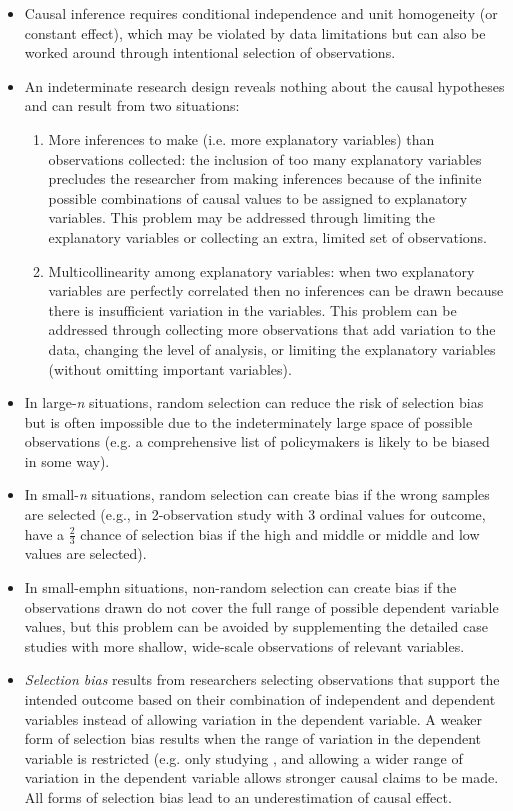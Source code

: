 \documentclass[11pt,letterpaper]{article}
\begin{document}
\begin{itemize}
\item Causal inference requires conditional independence and unit homogeneity (or constant effect), which may be violated by data limitations but can also be worked around through intentional selection of observations. 
\item An indeterminate research design reveals nothing about the causal hypotheses and can result from two situations: 
\begin{enumerate}
\item More inferences to make (i.e. more explanatory variables) than observations collected: the inclusion of too many explanatory variables precludes the researcher from making inferences because of the infinite possible combinations of causal values to be assigned to explanatory variables. This problem may be addressed through limiting the explanatory variables or collecting an extra, limited set of observations.
\item Multicollinearity among explanatory variables: when two explanatory variables are perfectly correlated then no inferences can be drawn because there is insufficient variation in the variables. This problem can be addressed through collecting more observations that add variation to the data, changing the level of analysis, or limiting the explanatory variables (without omitting important variables).
\end{enumerate}
\item In large-\emph{n} situations, random selection can reduce the risk of selection bias but is often impossible due to the indeterminately large space of possible observations (e.g. a comprehensive list of policymakers is likely to be biased in some way).
\item In small-\emph{n} situations, random selection can create bias if the wrong samples are selected (e.g., in 2-observation study with 3 ordinal values for outcome, have a $\frac{2}{3}$ chance of selection bias if the high and middle or middle and low values are selected). 
\item In small-emph{n} situations, non-random selection can create bias if the observations drawn do not cover the full range of possible dependent variable values, but this problem can be avoided by supplementing the detailed case studies with more shallow, wide-scale observations of relevant variables.
\item \emph{Selection bias} results from researchers selecting observations that support the intended outcome based on their combination of independent and dependent variables instead of allowing variation in the dependent variable. A weaker form of selection bias results when the range of variation in the dependent variable is restricted (e.g. only studying , and allowing a wider range of variation in the dependent variable allows stronger causal claims to be made. All forms of selection bias lead to an underestimation of causal effect.

\end{itemize}
\end{document}
